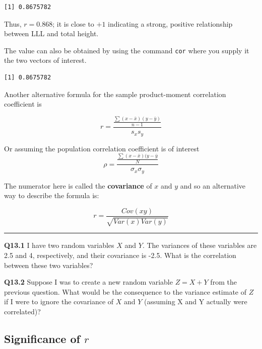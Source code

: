 \documentclass[
  oneside]{krantz}
\newenvironment{Shaded}{\begin{snugshade}}{\end{snugshade}}
\newcommand{\FunctionTok}[1]{\textcolor[rgb]{0.00,0.00,0.00}{#1}}
\newcommand{\NormalTok}[1]{#1}
\newcommand{\SpecialCharTok}[1]{\textcolor[rgb]{0.00,0.00,0.00}{#1}}
\begin{document}
\begin{verbatim}
[1] 0.8675782
\end{verbatim}

Thus, \(r = 0.868\); it is close to \(+1\) indicating a strong, positive relationship between LLL and total height.

The value can also be obtained by using the command \texttt{cor} where you supply it the two vectors of interest.

\begin{Shaded}
\end{Shaded}

\begin{verbatim}
[1] 0.8675782
\end{verbatim}

Another alternative formula for the sample product-moment correlation coefficient is

\[r= \frac{\frac{\sum (x-\bar{x})(y-\bar{y})}{n-1}}{s_xs_y}\]

Or assuming the population correlation coefficient is of interest
\[\rho= \frac{\frac{\sum (x-\bar{x})(y-\bar{y}}{N}}{\sigma_x\sigma_y}\]

The numerator here is called the \textbf{covariance} of \(x\) and \(y\) and so an alternative way to describe the formula is:

\[r = \frac{Cov(xy)}{\sqrt{Var(x)Var(y)}}\]

\begin{center}\rule{0.5\linewidth}{0.5pt}\end{center}

\textbf{Q13.1} I have two random variables \(X\) and \(Y\). The variances of these variables are 2.5 and 4, respectively, and their covariance is -2.5. What is the correlation between these two variables?

\textbf{Q13.2} Suppose I was to create a new random variable \(Z=X + Y\) from the previous question. What would be the consequence to the variance estimate of \(Z\) if I were to ignore the covariance of \(X\) and \(Y\) (assuming X and Y actually were correlated)?

\hypertarget{significance-of-r}{%
\subsection{\texorpdfstring{Significance of \(r\)}{Significance of r}}\label{significance-of-r}}
\end{document}

